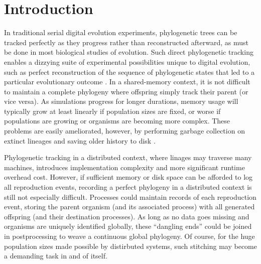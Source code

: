 \section{Introduction} \label{sec:introduction}

In traditional serial digital evolution experiments, phylogenetic trees can be tracked perfectly as they progress \citep{bohm2017mabe,wang2018vine,lalejini2019data} rather than reconstructed afterward, as must be done in most biological studies of evolution.
Such direct phylogenetic tracking enables a dizzying suite of experimental possibilities unique to digital evolution, such as perfect reconstruction of the sequence of phylogenetic states that led to a particular evolutionary outcome \citep{lenski2003evolutionary, dolson2020interpreting}.
In a shared-memory context, it is not difficult to maintain a complete phylogeny where offspring simply track their parent (or vice versa).
As simulations progress for longer durations, memory usage will typically grow at least linearly if population sizes are fixed, or worse if populations are growing or organisms are becoming more complex.
These problems are easily ameliorated, however, by performing garbage collection on extinct lineages and saving older history to disk \citep{bohm2017mabe,dolson2019modes}.

Phylogenetic tracking in a distributed context, where linages may traverse many machines, introduces implementation complexity and more significant runtime overhead cost.
However, if sufficient memory or disk space can be afforded to log all reproduction events, recording a perfect phylogeny in a distributed context is still not especially difficult.
Processes could maintain records of each reproduction event, storing the parent organism (and its associated process) with all generated offspring (and their destination processes).
As long as no data goes missing and organisms are uniquely identified globally, these ``dangling ends'' could be joined in postprocessing to weave a continuous global phylogeny.
Of course, for the huge population sizes made possible by distirbuted systems, such stitching may become a demanding task in and of itself.


